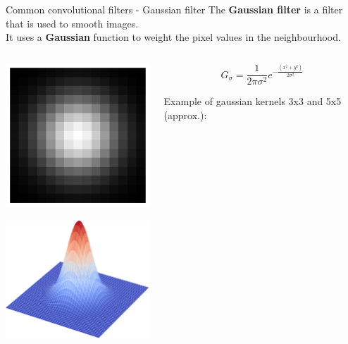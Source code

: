 \documentclass[9pt, aspectratio=169]{beamer}
\begin{document}
\begin{frame}
    {Common convolutional filters - Gaussian filter}
    The \textbf{Gaussian filter} is a filter that is used to smooth images.\\

    It uses a \textbf{Gaussian} function to weight the pixel values in the neighbourhood.\\

    \vspace{2em}

    \begin{columns}
        \begin{column}{.3\textwidth}
            \centering
            \includegraphics[width=.5\textwidth]{gaussian.png}

            \vspace{2em}

            \includegraphics[width=.5\textwidth]{gaussian3D.png}
        \end{column}
        \begin{column}{.7\textwidth}
            \begin{Large}
                $$G_\sigma = \frac{1}{2\pi\sigma^2}e^{-\frac{(x^2+y^2)}{2\sigma^2}}$$
            \end{Large}

            \centering
            Example of gaussian kernels 3x3 and 5x5 (approx.):


\end{column}
\end{columns}
\end{frame}
\end{document}
